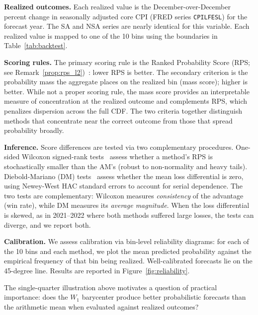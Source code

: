 \noindent\textbf{Realized outcomes.}  Each realized value is the December-over-December percent change in seasonally adjusted core CPI (FRED series \texttt{CPILFESL}) for the forecast year.  The SA and NSA series are nearly identical for this variable.  Each realized value is mapped to one of the 10 bins using the boundaries in Table~\ref{tab:backtest}.

\noindent\textbf{Scoring rules.}  The primary scoring rule is the Ranked Probability Score (RPS; see Remark~\ref{prop:rps_l2})~\cite{gneiting07}: lower RPS is better.  The secondary criterion is the probability mass the aggregate places on the realized bin (mass score); higher is better.  While not a proper scoring rule, the mass score provides an interpretable measure of concentration at the realized outcome and complements RPS, which penalizes dispersion across the full CDF.  The two criteria together distinguish methods that concentrate near the correct outcome from those that spread probability broadly.

\noindent\textbf{Inference.}  Score differences are tested via two complementary procedures.  One-sided Wilcoxon signed-rank tests~\cite{gneiting07} assess whether a method's RPS is stochastically smaller than the AM's (robust to non-normality and heavy tails).  Diebold-Mariano (DM) tests~\cite{diebold95} assess whether the mean loss differential is zero, using Newey-West HAC standard errors to account for serial dependence.  The two tests are complementary: Wilcoxon measures \emph{consistency} of the advantage (win rate), while DM measures its \emph{average magnitude}.  When the loss differential is skewed, as in 2021--2022 where both methods suffered large losses, the tests can diverge, and we report both.

\noindent\textbf{Calibration.}  We assess calibration via bin-level reliability diagrams: for each of the 10 bins and each method, we plot the mean predicted probability against the empirical frequency of that bin being realized.  Well-calibrated forecasts lie on the 45-degree line.  Results are reported in Figure~\ref{fig:reliability}.

The single-quarter illustration above motivates a question of practical importance: does the $W_1$ barycenter produce better probabilistic forecasts than the arithmetic mean when evaluated against realized outcomes?

